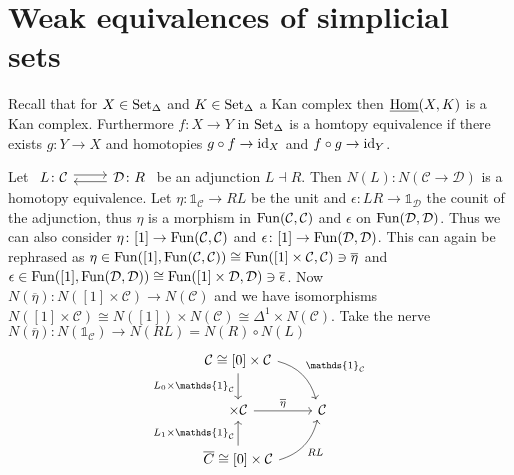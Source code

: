 \section{Weak equivalences of simplicial sets}

Recall that for $X \in \operatorname{Set}_{\Delta}$ and $K \in \operatorname{Set}_{\Delta}$ a Kan complex then $\underline{\operatorname{Hom}}(X,K)$ is a Kan complex.
Furthermore $f\colon X \to Y$ in $\operatorname{Set}_{\Delta}$ is a homtopy equivalence if there exists $g\colon Y \to X$ and homotopies $g \circ f \to \operatorname{id}_X$ and $ f \circ g \to \operatorname{id}_Y$.

\begin{exmp}
    Let $\begin{tikzcd}
            L \colon  \mathcal{C} 
            \arrow[r, shift left]
            &
            \mathcal{D} \colon R
            \arrow[l, shift left]
        \end{tikzcd}$
        be an adjunction $L \dashv R$.
        Then $N(L)\colon N( \mathcal{C} \to \mathcal{D})$ is a homotopy equivalence.
        Let $\eta \colon \mathds{1}_{\mathcal{C}} \to RL$ be the unit and $\epsilon\colon LR \to \mathds{1}_{\mathcal{D}}$ the counit of the adjunction, thus $\eta$ is a morphism in $\operatorname{Fun}( \mathcal{C} , \mathcal{C})$ and $\epsilon$ on $\operatorname{Fun}( \mathcal{D} , \mathcal{D} )$.
        Thus we can also consider $\eta \colon [1] \to \operatorname{Fun}(\mathcal{C},\mathcal{C})$ and $\epsilon \colon [1] \to \operatorname{Fun}(\mathcal{D},\mathcal{D})$.
        This can again be rephrased as $\eta \in \operatorname{Fun}( [1] , \operatorname{Fun}( \mathcal{C} , \mathcal{C})) \cong \operatorname{Fun} ( [1] \times \mathcal{C}, \mathcal{C}) \ni \overline{\eta}$ and $\epsilon \in \operatorname{Fun}( [1] , \operatorname{Fun}( \mathcal{D} , \mathcal{D})) \cong \operatorname{Fun} ( [1] \times \mathcal{D}, \mathcal{D}) \ni \overline{\epsilon}$.
        Now $N( \overline{\eta}) \colon N( [1] \times \mathcal{C}) \to N (\mathcal{C})$ and we have isomorphisms $N( [1] \times \mathcal{C}) \cong N([1]) \times N(\mathcal{C}) \cong \Delta^1 \times N(\mathcal{C})$.
        Take the nerve $N(\overline{\eta}) \colon N( \mathds{1}_{\mathcal{C}}) \to N(RL)= N(R) \circ N(L)$
        \[
        \begin{tikzcd}
            \mathcal{C} \cong [0] \times \mathcal{C}
            \ar[d, "L_0 \times \mathds{1}_{\mathcal{C}}"']
            \ar[rd, bend left, "\mathds{1}_{\mathcal{C}}"]
            \\
            [1] \times \mathcal{C}
            \ar[r, "\overline{\eta}"]
            &
            \mathcal{C}
            \\
            \overline{C}\cong [0] \times \mathcal{C} 
            \ar[u, "L_1 \times \mathds{1}_{\mathcal{C}}"]
            \ar[ru, bend right, "RL"']
        \end{tikzcd}
        \]
\end{exmp}

